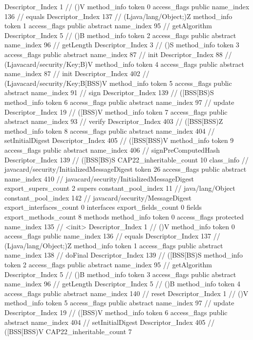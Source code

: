 {{{{{					Descriptor_Index	1		// ()V
				}
				method_info {
					token	0
					access_flags	public
					name_index	136		// equals
					Descriptor_Index	137		// (Ljava/lang/Object;)Z
				}
				method_info {
					token	1
					access_flags	public abstract
					name_index	95		// getAlgorithm
					Descriptor_Index	5		// ()B
				}
				method_info {
					token	2
					access_flags	public abstract
					name_index	96		// getLength
					Descriptor_Index	3		// ()S
				}
				method_info {
					token	3
					access_flags	public abstract
					name_index	87		// init
					Descriptor_Index	88		// (Ljavacard/security/Key;B)V
				}
				method_info {
					token	4
					access_flags	public abstract
					name_index	87		// init
					Descriptor_Index	402		// (Ljavacard/security/Key;B[BSS)V
				}
				method_info {
					token	5
					access_flags	public abstract
					name_index	91		// sign
					Descriptor_Index	139		// ([BSS[BS)S
				}
				method_info {
					token	6
					access_flags	public abstract
					name_index	97		// update
					Descriptor_Index	19		// ([BSS)V
				}
				method_info {
					token	7
					access_flags	public abstract
					name_index	93		// verify
					Descriptor_Index	403		// ([BSS[BSS)Z
				}
				method_info {
					token	8
					access_flags	public abstract
					name_index	404		// setInitialDigest
					Descriptor_Index	405		// ([BSS[BSS)V
				}
				method_info {
					token	9
					access_flags	public abstract
					name_index	406		// signPreComputedHash
					Descriptor_Index	139		// ([BSS[BS)S
				}
			}
			CAP22_inheritable_count	10
		}
		class_info {		// javacard/security/InitializedMessageDigest
			token	26
			access_flags	public abstract
			name_index	410		// javacard/security/InitializedMessageDigest
			export_supers_count	2
			supers {
				constant_pool_index	11		// java/lang/Object
				constant_pool_index	142		// javacard/security/MessageDigest
			}
			export_interfaces_count	0
			interfaces {
			}
			export_fields_count	0
			fields {
			}
			export_methods_count	8
			methods {
				method_info {
					token	0
					access_flags	protected
					name_index	135		// <init>
					Descriptor_Index	1		// ()V
				}
				method_info {
					token	0
					access_flags	public
					name_index	136		// equals
					Descriptor_Index	137		// (Ljava/lang/Object;)Z
				}
				method_info {
					token	1
					access_flags	public abstract
					name_index	138		// doFinal
					Descriptor_Index	139		// ([BSS[BS)S
				}
				method_info {
					token	2
					access_flags	public abstract
					name_index	95		// getAlgorithm
					Descriptor_Index	5		// ()B
				}
				method_info {
					token	3
					access_flags	public abstract
					name_index	96		// getLength
					Descriptor_Index	5		// ()B
				}
				method_info {
					token	4
					access_flags	public abstract
					name_index	140		// reset
					Descriptor_Index	1		// ()V
				}
				method_info {
					token	5
					access_flags	public abstract
					name_index	97		// update
					Descriptor_Index	19		// ([BSS)V
				}
				method_info {
					token	6
					access_flags	public abstract
					name_index	404		// setInitialDigest
					Descriptor_Index	405		// ([BSS[BSS)V
				}
			}
			CAP22_inheritable_count	7
		}
	}
}
